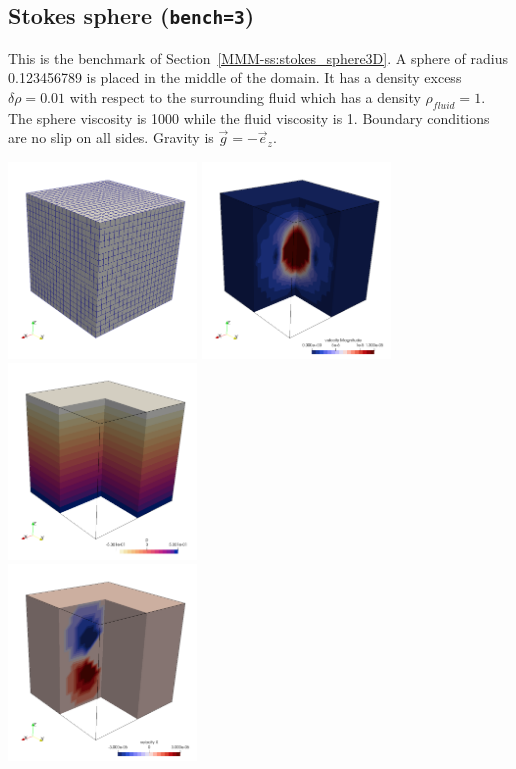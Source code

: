 \subsection*{Stokes sphere ({\tt bench=3})}

This is the benchmark of Section~\ref{MMM-ss:stokes_sphere3D}.
A sphere of radius 0.123456789 is placed in the middle of the domain. 
It has a density excess $\delta\rho=0.01$
with respect to the surrounding fluid which has a density $\rho_{fluid}=1$. 
The sphere viscosity is 1000 while the fluid viscosity is 1.
Boundary conditions are no slip on all sides. Gravity is $\vec{g}=-\vec{e}_z$.

\begin{center}
\includegraphics[width=5cm]{python_codes/fieldstone_82/RESULTS/bench3/grid.png}
\includegraphics[width=5cm]{python_codes/fieldstone_82/RESULTS/bench3/vel.png}
\includegraphics[width=5cm]{python_codes/fieldstone_82/RESULTS/bench3/press.png}\\
\includegraphics[width=5cm]{python_codes/fieldstone_82/RESULTS/bench3/u.png}

\end{center}
